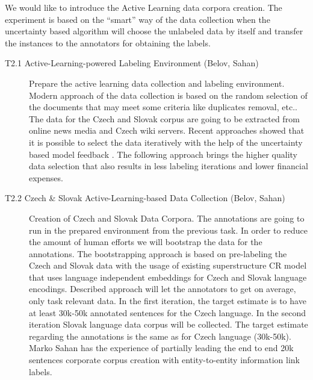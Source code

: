 We would like to introduce the Active Learning data corpora creation. The experiment is based on the “smart” way of the data collection when the uncertainty based algorithm will choose the unlabeled data by itself and transfer the instances to the annotators for obtaining the labels. 

\begin{description}
	\item [T2.1 Active-Learning-powered Labeling Environment (Belov, Sahan)] Prepare the active learning data collection and labeling environment.
Modern approach of the data collection is based on the random selection of the documents that may meet some criteria like duplicates removal, etc.. The data for the Czech and Slovak corpus are going to be extracted from online news media and Czech wiki servers. Recent approaches showed that it is possible to select the data iteratively with the help of the uncertainty based model feedback \cite{gal2017deep, lowell2018practical}. The following approach brings the higher quality data selection that also results in less labeling iterations and lower financial expenses.

	\item [T2.2 Czech \& Slovak Active-Learning-based Data Collection (Belov, Sahan)] Creation of Czech and Slovak Data Corpora. The annotations are going to run in the prepared environment from the previous task. In order to reduce the amount of human efforts we will bootstrap the data for the annotations. The bootstrapping approach is based on pre-labeling the Czech and Slovak data with the usage of existing superstructure CR model that uses language independent embeddings for Czech and Slovak language encodings. Described approach will let the annotators to get on average, only task relevant data.
In the first iteration, the target estimate is to have at least 30k-50k annotated sentences for the Czech language. In the second iteration Slovak language data corpus will be collected. The target estimate regarding the annotations is the same as for Czech language (30k-50k). Marko Sahan has the experience of partially leading the end to end 20k sentences corporate corpus creation with entity-to-entity information link labels.  


\end{description}
